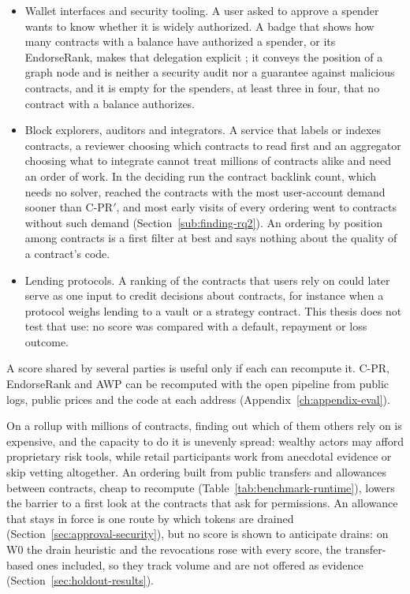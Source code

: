 \begin{itemize}
\item Wallet interfaces and security tooling. A user asked to approve a spender wants to know whether it is widely authorized. A badge that shows how many contracts with a balance have authorized a spender, or its EndorseRank, makes that delegation explicit \parencite{vogelsteller2015erc20,lundfall2020permit}; it conveys the position of a graph node and is neither a security audit nor a guarantee against malicious contracts, and it is empty for the spenders, at least three in four, that no contract with a balance authorizes.
\item Block explorers, auditors and integrators. A service that labels or indexes contracts, a reviewer choosing which contracts to read first and an aggregator choosing what to integrate cannot treat millions of contracts alike and need an order of work. In the deciding run the contract backlink count, which needs no solver, reached the contracts with the most user-account demand sooner than \mbox{C-PR}$'$, and most early visits of every ordering went to contracts without such demand (Section~\ref{sub:finding-rq2}). An ordering by position among contracts is a first filter at best and says nothing about the quality of a contract's code.
\item Lending protocols. A ranking of the contracts that users rely on could later serve as one input to credit decisions about contracts, for instance when a protocol weighs lending to a vault or a strategy contract. This thesis does not test that use: no score was compared with a default, repayment or loss outcome.
\end{itemize}


A score shared by several parties is useful only if each can recompute it. \mbox{C-PR}, EndorseRank and AWP can be recomputed with the open pipeline from public logs, public prices and the code at each address (Appendix~\ref{ch:appendix-eval}).


On a rollup with millions of contracts, finding out which of them others rely on is expensive, and the capacity to do it is unevenly spread: wealthy actors may afford proprietary risk tools, while retail participants work from anecdotal evidence or skip vetting altogether. An ordering built from public transfers and allowances between contracts, cheap to recompute (Table~\ref{tab:benchmark-runtime}), lowers the barrier to a first look at the contracts that ask for permissions. An allowance that stays in force is one route by which tokens are drained (Section~\ref{sec:approval-security}), but no score is shown to anticipate drains: on W0 the drain heuristic and the revocations rose with every score, the transfer-based ones included, so they track volume and are not offered as evidence (Section~\ref{sec:holdout-results}).

